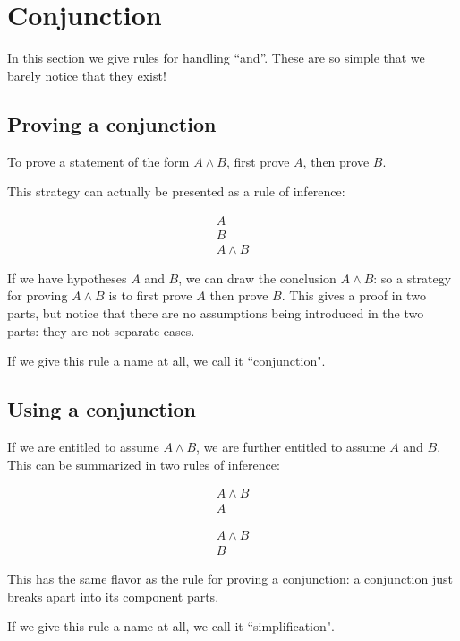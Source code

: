 \documentclass[12pt]{book}
\begin{document}
\section{Conjunction}

In this section we give rules for handling ``and''.  These are so simple that we barely notice that they exist!

\subsection{Proving a conjunction}

To prove a statement of the form $A \wedge B$, first prove $A$, then prove
$B$.

This strategy can actually be presented as a rule of inference:

$$\begin{array}{l} A \\ B \\ \hline A \wedge B \end{array}$$

If we have hypotheses $A$ and $B$, we can draw the conclusion $A \wedge B$:  so a strategy for proving $A \wedge B$ is to first prove $A$ then prove $B$.  This gives a proof in two parts, but notice that there are no assumptions being introduced in the two parts:  they are not separate cases.

If we give this rule a name at all, we call it ``conjunction".

\subsection{Using a conjunction}

If we are entitled to assume $A \wedge B$, we are further entitled to assume $A$ and $B$.  This can be summarized in two rules of inference:

$$\begin{array}{l} A \wedge B \\ \hline A \end{array}$$

$$\begin{array}{l} A \wedge B \\ \hline B \end{array}$$

This has the same flavor as the rule for proving a conjunction:  a conjunction just breaks apart into its component parts.

If we give this rule a name at all, we call it ``simplification".
\end{document}
